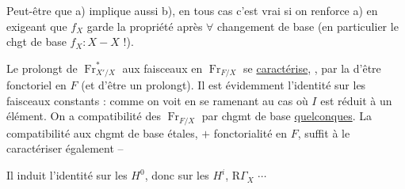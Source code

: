Peut-être que a) implique aussi b), en tous cas c'est vrai si on renforce a) en exigeant que $f_X$ garde la propriété  après \uline{$\forall$} changement de base (en particulier le chgt de base $f_X:X\mathbin{-}X$ !).

Le prolongt de $\operatorname{Fr}_{X'/X}^*$  aux faisceaux en $\operatorname{Fr}_{F/X}$ se \uline{caractérise}, , par la  d'être fonctoriel en $F$ (et d'être un prolongt). Il est évidemment l'identité sur les faisceaux constants :
comme on voit en se ramenant au cas où $I$ est réduit à un élément. On a  compatibilité des $\operatorname{Fr}_{F/X}$ par chgmt de base \uline{quelconques}. La compatibilité aux chgmt de base étales, $+$ fonctorialité en $F$, suffit à le caractériser également -- 

Il induit l'identité sur les $H^0$, donc sur les $H^i$, $\mathrm R\Gamma_X$ $\cdots$
